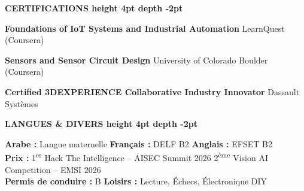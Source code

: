 \documentclass[10pt,a4paper]{altacv}
\renewcommand{\cvsection}[2][]{%
  \medskip%
  {\color{heading}\LARGE\bfseries #2 \hspace{0.2em}\leaders\vrule height 4pt depth -2pt\hfill\mbox{}}\par\smallskip
}
\begin{document}
\cvsection{CERTIFICATIONS}
{\large\bfseries\color{accent} Foundations of IoT Systems and Industrial Automation} \hfill \color{emphasis}LearnQuest (Coursera)\par\smallskip
{\large\bfseries\color{accent} Sensors and Sensor Circuit Design} \hfill \color{emphasis}University of Colorado Boulder (Coursera)\par\smallskip
{\large\bfseries\color{accent} Certified 3DEXPERIENCE Collaborative Industry Innovator} \hfill \color{emphasis}Dassault Systèmes\par\smallskip

\cvsection{LANGUES \& DIVERS}
\textbf{Arabe :} Langue maternelle \hfill \textbf{Français :} DELF B2 \hfill \textbf{Anglais :} EFSET B2\\[2pt]
\textbf{Prix :} 1\textsuperscript{er} Hack The Intelligence -- AISEC Summit 2026 \hfill 2\textsuperscript{ème} Vision AI Competition -- EMSI 2026\\[2pt]
\textbf{Permis de conduire :} B \hfill \textbf{Loisirs :} Lecture, Échecs, Électronique DIY
\end{document}
